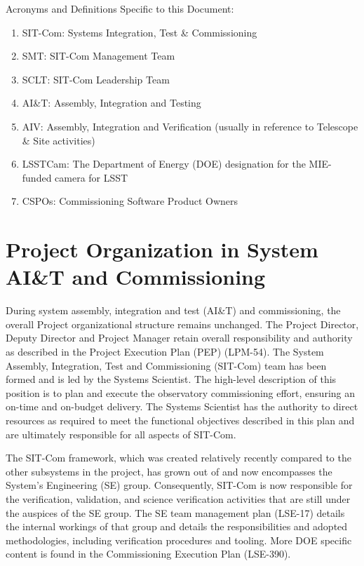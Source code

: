 \documentclass[SE,toc]{lsstdoc}
\begin{document}
Acronyms and Definitions Specific to this Document:
\begin{enumerate}
    \item SIT-Com: Systems Integration, Test \& Commissioning
    \item SMT: SIT-Com Management Team
    \item SCLT: SIT-Com Leadership Team
    \item AI\&T: Assembly, Integration and Testing
    \item AIV: Assembly, Integration and Verification (usually in reference to Telescope \& Site activities)
    \item LSSTCam: The Department of Energy (DOE) designation for the MIE-funded camera for LSST
    \item CSPOs: Commissioning Software Product Owners
\end{enumerate}

\section{Project Organization in System AI\&T and Commissioning}
\label{sec:project_organization}

During system assembly, integration and test (AI\&T) and commissioning, the overall Project organizational structure remains unchanged.
The Project Director, Deputy Director and Project Manager retain overall responsibility and authority as described in the Project Execution Plan (PEP) (LPM-54).
The System Assembly, Integration, Test and Commissioning (SIT-Com) team has been formed and is led by the Systems Scientist.
The high-level description of this position is to plan and execute the observatory commissioning effort, ensuring an on-time and on-budget delivery.
The Systems Scientist has the authority to direct resources as required to meet the functional objectives described in this plan and are ultimately responsible for all aspects of SIT-Com.

The SIT-Com framework, which was created relatively recently compared to the other subsystems in the project, has grown out of and now encompasses the System’s Engineering (SE) group.
Consequently, SIT-Com is now responsible for the verification, validation, and science verification activities that are still under the auspices of the SE group.
The SE team management plan (LSE-17) details the internal workings of that group and details the responsibilities and adopted methodologies, including verification procedures and tooling.
More DOE specific content is found in the Commissioning Execution Plan (LSE-390).
\end{document}
